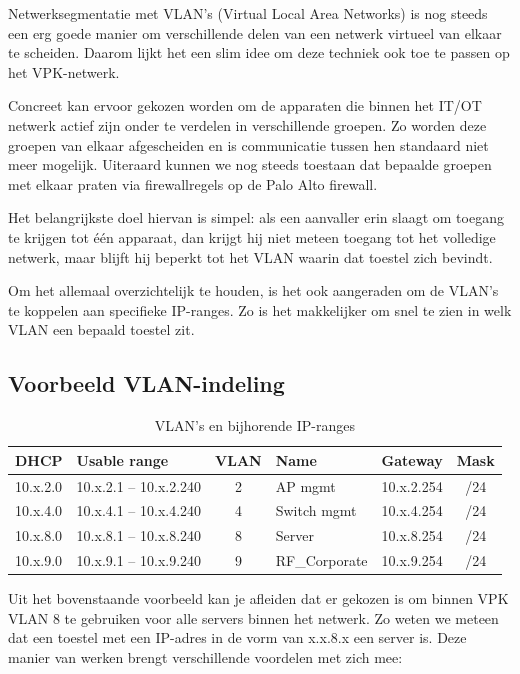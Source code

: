Netwerksegmentatie met VLAN’s (Virtual Local Area Networks) is nog steeds een erg goede manier om verschillende delen van een netwerk virtueel van elkaar te scheiden. Daarom lijkt het een slim idee om deze techniek ook toe te passen op het VPK-netwerk.

Concreet kan ervoor gekozen worden om de apparaten die binnen het IT/OT netwerk actief zijn onder te verdelen in verschillende groepen. Zo worden deze groepen van elkaar afgescheiden en is communicatie tussen hen standaard niet meer mogelijk. Uiteraard kunnen we nog steeds toestaan dat bepaalde groepen met elkaar praten via firewallregels op de Palo Alto firewall.

Het belangrijkste doel hiervan is simpel: als een aanvaller erin slaagt om toegang te krijgen tot één apparaat, dan krijgt hij niet meteen toegang tot het volledige netwerk, maar blijft hij beperkt tot het VLAN waarin dat toestel zich bevindt.

Om het allemaal overzichtelijk te houden, is het ook aangeraden om de VLAN’s te koppelen aan specifieke IP-ranges. Zo is het makkelijker om snel te zien in welk VLAN een bepaald toestel zit.

\subsection*{Voorbeeld VLAN-indeling}

\begin{table}[h!]
    \centering
    \begin{tabular}{|l|l|c|l|l|c|}
        \hline
        \textbf{DHCP} & \textbf{Usable range} & \textbf{VLAN} & \textbf{Name} & \textbf{Gateway} & \textbf{Mask} \\
        \hline
        10.x.2.0 & 10.x.2.1 -- 10.x.2.240 & 2 & AP mgmt & 10.x.2.254 & /24 \\
        10.x.4.0 & 10.x.4.1 -- 10.x.4.240 & 4 & Switch mgmt & 10.x.4.254 & /24 \\
        10.x.8.0 & 10.x.8.1 -- 10.x.8.240 & 8 & Server & 10.x.8.254 & /24 \\
        10.x.9.0 & 10.x.9.1 -- 10.x.9.240 & 9 & RF\_Corporate & 10.x.9.254 & /24 \\
        \hline
    \end{tabular}
    \caption{VLAN's en bijhorende IP-ranges}
\end{table}

Uit het bovenstaande voorbeeld kan je afleiden dat er gekozen is om binnen VPK VLAN 8 te gebruiken voor alle servers binnen het netwerk. Zo weten we meteen dat een toestel met een IP-adres in de vorm van x.x.8.x een server is. Deze manier van werken brengt verschillende voordelen met zich mee:

